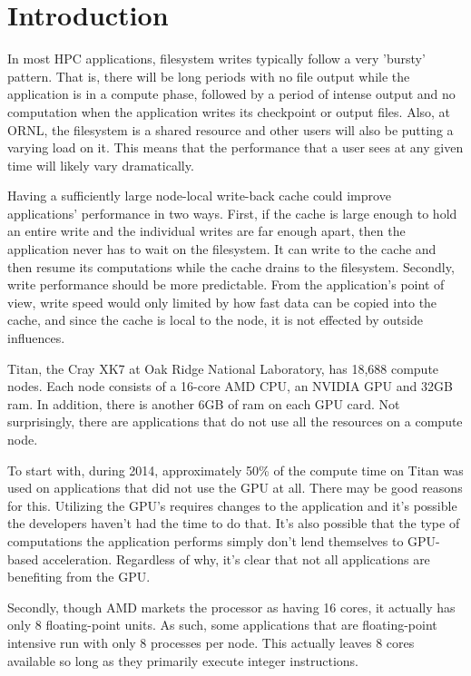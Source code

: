 \section{Introduction}
\label{sec:intro}

In most HPC applications, filesystem writes typically follow a very 'bursty' pattern. That is, there will be long periods with no file output while the application is in a compute phase, followed by a period of intense output and no computation when the application writes its checkpoint or output files.  Also, at ORNL, the filesystem is a shared resource and other users will also be putting a varying load on it. This means that the performance that a user sees at any given time will likely vary dramatically.

Having a sufficiently large node-local write-back cache could improve applications' performance in two ways.  First, if the cache is large enough to hold an entire write and the individual writes are far enough apart, then the application never has to wait on the filesystem.  It can write to the cache and then resume its computations while the cache drains to the filesystem.  Secondly, write performance should be more predictable. From the application's point of view, write speed would only limited by how fast data can be copied into the cache, and since the cache is local to the node, it is not effected by outside influences.

Titan, the Cray XK7 at Oak Ridge National Laboratory, has 18,688 compute nodes. Each node consists of a 16-core AMD CPU, an NVIDIA GPU and 32GB ram. In addition, there is another 6GB of ram on each GPU card. Not surprisingly, there are applications that do not use all the resources on a compute node.

To start with, during 2014, approximately 50\% of the compute time on Titan was used on applications that did not use the GPU at all.\cite{oareport}
There may be good reasons for this.  Utilizing the GPU's requires changes to the application and it's possible the developers haven't had the time to do that.  It's also possible that the type of computations the application performs simply don't lend themselves to GPU-based acceleration.  Regardless of why, it's clear that not all applications are benefiting from the GPU.

Secondly, though AMD markets the processor as having 16 cores, it actually has only 8 floating-point units. As such, some applications that are floating-point intensive run with only 8 processes per node. This actually leaves 8 cores available so long as they primarily execute integer instructions. 

